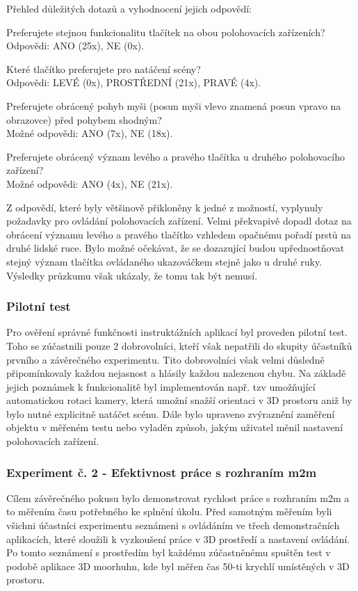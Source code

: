 \noindent Přehled důležitých dotazů a vyhodnocení jejich odpovědí:

\noindent Preferujete stejnou funkcionalitu tlačítek na obou polohovacích zařízeních?\\
Odpovědi: ANO (25x), NE (0x).

\noindent Které tlačítko preferujete pro natáčení scény?\\
Odpovědi: LEVÉ (0x), PROSTŘEDNÍ (21x), PRAVÉ (4x).

\noindent Preferujete obrácený pohyb myši (posun myši vlevo znamená posun vpravo na obrazovce) před pohybem shodným?\\
Možné odpovědi: ANO (7x), NE (18x).

\noindent Preferujete obrácený význam levého a pravého tlačítka u druhého polohovacího zařízení?\\
Možné odpovědi: ANO (4x), NE (21x).

Z odpovědí, které byly většinově přikloněny k jedné z možností, vyplynuly požadavky pro ovládání polohovacích zařízení. Velmi překvapivě dopadl dotaz na obrácení významu levého a pravého tlačítko vzhledem opačnému pořadí prstů na druhé lidské ruce. Bylo možné očekávat, že se dozazující budou upřednostňovat stejný význam tlačítka ovládaného ukazováčkem stejně jako u druhé ruky. Výsledky průzkumu však ukázaly, že tomu tak být nemusí. 

\subsubsection{Pilotní test}
Pro ověření správné funkčnosti instruktážních aplikací byl proveden pilotní test. Toho se zúčastnili pouze 2 dobrovolníci, kteří však nepatřili do skupity účastníků prvního a závěrečného experimentu. Tito dobrovolníci však velmi důsledně připomínkovaly každou nejasnost a hlásily každou nalezenou chybu. Na základě jejich poznámek k funkcionalitě byl implementován např. tzv  umožňující automatickou rotaci kamery, která umožní snažší orientaci v 3D prostoru aniž by bylo nutné explicitně natáčet scénu. Dále bylo upraveno zvýraznění zaměření objektu v měřeném testu nebo vyladěn způsob, jakým uživatel měnil nastavení polohovacích zařízení.

\subsubsection{Experiment č. 2 - Efektivnost práce s rozhraním m2m}
Cílem závěrečného pokusu bylo demonstrovat rychlost práce s rozhraním m2m a to měřením času potřebného ke splnění úkolu. Před samotným měřením byli všichni účastníci experimentu seznámeni s ovládáním ve třech demonstračních aplikacích, které sloužili k vyzkoušení práce v 3D prostředí a nastavení ovládání. Po tomto seznámení s prostředím byl každému zúčastněnému spuštěn test v podobě aplikace 3D moorhuhn, kde byl měřen čas  50-ti krychlí umístěných v 3D prostoru.

